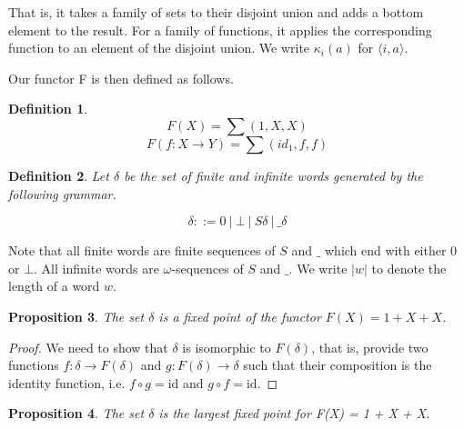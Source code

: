 \documentclass[a4paper]{article}
\newcommand{\arr}{\rightarrow}
\newtheorem{defNuF}{Definition}[section]
\newtheorem{defF}[defNuF]{Definition}
\newtheorem{thmDomNuFisFixedPoint}[defNuF]{Proposition}
\newtheorem{thmDomNuFisFinal}[defNuF]{Proposition}
\begin{document}
That is, it takes a family of sets to their disjoint union and adds a bottom
element to the result.  For a family of functions, it applies the corresponding
function to an element of the disjoint union.  We write $\kappa_i(a)$ for
$\langle i, a \rangle$.

Our functor F is then defined as follows.

\begin{defF}
\begin{equation*}
F(X) = \sum{(1, X, X)}
\end{equation*}
\begin{equation*}
F(f : X \arr Y) = \sum{(id_1, f, f)}
\end{equation*}
\end{defF}

\begin{defNuF}

Let $\delta$ be the set of finite and infinite words generated by the following
grammar.

\begin{equation*}
\delta ::= 0 \ |\ \bot \ |\ S \delta \ |\ \_ \delta
\end{equation*}

\end{defNuF}

Note that all finite words are finite sequences of $S$ and $\_$ which end with
either $0$ or $\bot$. All infinite words are $\omega$-sequences of $S$ and $\_$.
We write $|w|$ to denote the length of a word $w$.

\begin{thmDomNuFisFixedPoint}

The set $\delta$ is a fixed point of the functor $F(X) = 1 + X + X$.

\end{thmDomNuFisFixedPoint}

\begin{proof}

We need to show that $\delta$ is isomorphic to $F(\delta)$, that is, provide two
functions $f : \delta \arr F(\delta)$ and $g : F(\delta) \arr \delta$ such that
their composition is the identity function, i.e. $f \circ g = \text{id}$ and $g
\circ f = \text{id}$.

\end{proof}

\begin{thmDomNuFisFinal}

The set $\delta$ is the largest fixed point for F(X) = 1 + X + X.

\end{thmDomNuFisFinal}
\end{document}
